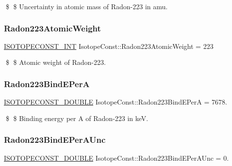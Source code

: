 \$ \$ Uncertainty in atomic mass of Radon-\/223 in amu. \mbox{\label{group___isotope_const-_radon-_rn223_ga4e0028468deef1503e9a40a5436881ab}} 
\subsubsection{\texorpdfstring{Radon223\+Atomic\+Weight}{Radon223AtomicWeight}}
{\footnotesize\ttfamily \mbox{\hyperlink{group___isotope_const-_macros_ga5f18360b3e99483a35c32d789e62621c}{I\+S\+O\+T\+O\+P\+E\+C\+O\+N\+S\+T\+\_\+\+I\+NT}} Isotope\+Const\+::\+Radon223\+Atomic\+Weight = 223}

\$ \$ Atomic weight of Radon-\/223. \mbox{\label{group___isotope_const-_radon-_rn223_ga1a834d0f27ae8691fe94108ee8f82a1a}} 
\subsubsection{\texorpdfstring{Radon223\+Bind\+E\+PerA}{Radon223BindEPerA}}
{\footnotesize\ttfamily \mbox{\hyperlink{group___isotope_const-_macros_ga8f45a7272ce02c0b4c65c44636ed719a}{I\+S\+O\+T\+O\+P\+E\+C\+O\+N\+S\+T\+\_\+\+D\+O\+U\+B\+LE}} Isotope\+Const\+::\+Radon223\+Bind\+E\+PerA = 7678.}

\$ \$ Binding energy per A of Radon-\/223 in keV. \mbox{\label{group___isotope_const-_radon-_rn223_ga17094b936978f1cf33c08035fbeb61af}} 
\subsubsection{\texorpdfstring{Radon223\+Bind\+E\+Per\+A\+Unc}{Radon223BindEPerAUnc}}
{\footnotesize\ttfamily \mbox{\hyperlink{group___isotope_const-_macros_ga8f45a7272ce02c0b4c65c44636ed719a}{I\+S\+O\+T\+O\+P\+E\+C\+O\+N\+S\+T\+\_\+\+D\+O\+U\+B\+LE}} Isotope\+Const\+::\+Radon223\+Bind\+E\+Per\+A\+Unc = 0.}

